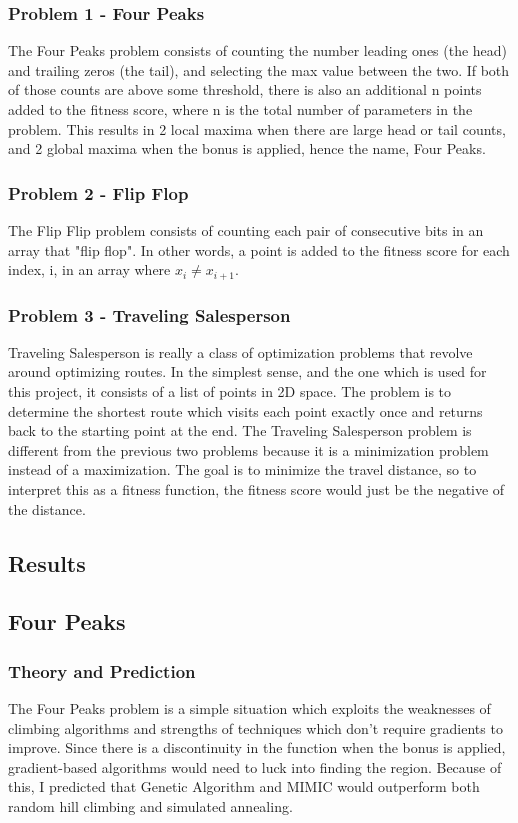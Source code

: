 \documentclass[
	letterpaper, %
]{mlreport}
\begin{document}
\subsubsection{Problem 1 - Four Peaks}
The Four Peaks problem consists of counting the number leading ones (the head) and trailing zeros (the tail), and selecting the max value between the two. If both of those counts are above some threshold, there is also an additional n points added to the fitness score, where n is the total number of parameters in the problem. This results in 2 local maxima when there are large head or tail counts, and 2 global maxima when the bonus is applied, hence the name, Four Peaks.

\subsubsection{Problem 2 - Flip Flop}
The Flip Flip problem consists of counting each pair of consecutive bits in an array that "flip flop". In other words, a point is added to the fitness score for each index, i, in an array where $x_i \neq x_{i+1}$.

\subsubsection{Problem 3 - Traveling Salesperson}
Traveling Salesperson is really a class of optimization problems that revolve around optimizing routes. In the simplest sense, and the one which is used for this project, it consists of a list of points in 2D space. The problem is to determine the shortest route which visits each point exactly once and returns back to the starting point at the end. The Traveling Salesperson problem is different from the previous two problems because it is a minimization problem instead of a maximization. The goal is to minimize the travel distance, so to interpret this as a fitness function, the fitness score would just be the negative of the distance.

\subsection{Results}

\subsection{Four Peaks}
\subsubsection{Theory and Prediction}
The Four Peaks problem is a simple situation which exploits the weaknesses of climbing algorithms and strengths of techniques which don't require gradients to improve. Since there is a discontinuity in the function when the bonus is applied, gradient-based algorithms would need to luck into finding the region. Because of this, I predicted that Genetic Algorithm and MIMIC would outperform both random hill climbing and simulated annealing.
\end{document}
